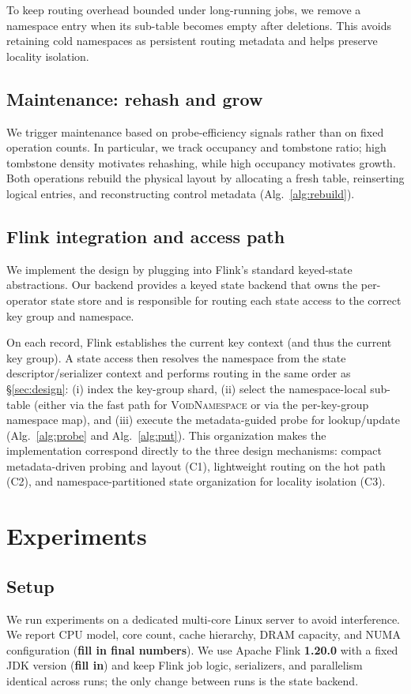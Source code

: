 \documentclass[sigconf]{acmart}
\begin{document}
To keep routing overhead bounded under long-running jobs, we remove a namespace entry when its sub-table becomes empty after deletions. This avoids retaining cold namespaces as persistent routing metadata and helps preserve locality isolation.

\subsection{Maintenance: rehash and grow}
We trigger maintenance based on probe-efficiency signals rather than on fixed operation counts. In particular, we track occupancy and tombstone ratio; high tombstone density motivates rehashing, while high occupancy motivates growth. Both operations rebuild the physical layout by allocating a fresh table, reinserting logical entries, and reconstructing control metadata (Alg.~\ref{alg:rebuild}).

\subsection{Flink integration and access path}
We implement the design by plugging into Flink's standard keyed-state abstractions. Our backend provides a keyed state backend that owns the per-operator state store and is responsible for routing each state access to the correct key group and namespace.

On each record, Flink establishes the current key context (and thus the current key group). A state access then resolves the namespace from the state descriptor/serializer context and performs routing in the same order as \S\ref{sec:design}: (i) index the key-group shard, (ii) select the namespace-local sub-table (either via the fast path for \textsc{VoidNamespace} or via the per-key-group namespace map), and (iii) execute the metadata-guided probe for lookup/update (Alg.~\ref{alg:probe} and Alg.~\ref{alg:put}). This organization makes the implementation correspond directly to the three design mechanisms: compact metadata-driven probing and layout (C1), lightweight routing on the hot path (C2), and namespace-partitioned state organization for locality isolation (C3).

\section{Experiments}
\label{sec:experiments}

\subsection{Setup}
We run experiments on a dedicated multi-core Linux server to avoid interference.
We report CPU model, core count, cache hierarchy, DRAM capacity, and NUMA configuration (\textbf{fill in final numbers}).
We use Apache Flink \textbf{1.20.0} with a fixed JDK version (\textbf{fill in}) and keep Flink job logic, serializers, and parallelism identical across runs; the only change between runs is the state backend.
\end{document}
